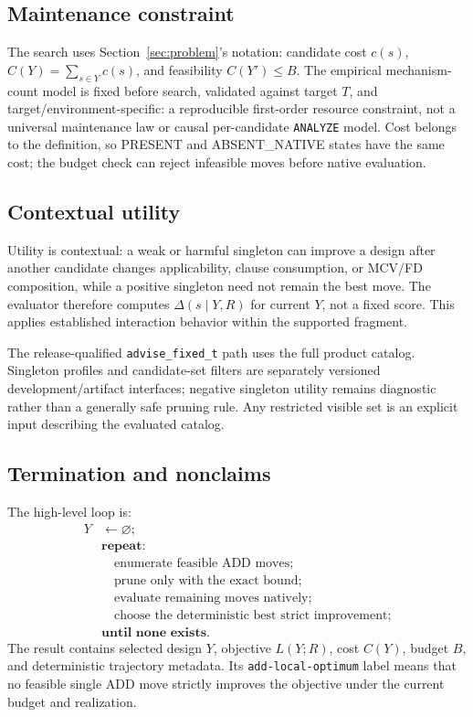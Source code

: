\subsection{Maintenance constraint}

The search uses Section~\ref{sec:problem}'s notation: candidate cost $c(s)$,
$C(Y)=\sum_{s\in Y}c(s)$, and feasibility $C(Y')\le B$.  The empirical
mechanism-count model is fixed before search, validated against target $T$, and
target/environment-specific: a reproducible first-order resource constraint,
not a universal maintenance law or causal per-candidate \texttt{ANALYZE}
model.  Cost belongs to the definition, so PRESENT and ABSENT\_NATIVE states
have the same cost; the budget check can reject infeasible moves before native
evaluation.

\subsection{Contextual utility}

Utility is contextual: a weak or harmful singleton can improve a design after
another candidate changes applicability, clause consumption, or MCV/FD
composition, while a positive singleton need not remain the best move.  The
evaluator therefore computes $\Delta(s\mid Y,R)$ for current $Y$, not a fixed
score.  This applies established interaction behavior within the supported
fragment.

The release-qualified \texttt{advise\_fixed\_t} path uses the full product
catalog.  Singleton profiles and candidate-set filters are separately
versioned development/artifact interfaces; negative singleton utility remains
diagnostic rather than a generally safe pruning rule.  Any restricted visible
set is an explicit input describing the evaluated catalog.

\subsection{Termination and nonclaims}

The high-level loop is:
\[
\begin{aligned}
Y&\leftarrow\varnothing;\\
&\textbf{repeat:}\\
&\quad\text{enumerate feasible ADD moves;}\\
&\quad\text{prune only with the exact bound;}\\
&\quad\text{evaluate remaining moves natively;}\\
&\quad\text{choose the deterministic best strict improvement;}\\
&\textbf{until none exists.}
\end{aligned}
\]
The result contains selected design $Y$, objective $L(Y;R)$, cost $C(Y)$,
budget $B$, and deterministic trajectory metadata.  Its
\texttt{add-local-optimum} label means that no feasible single ADD move
strictly improves the objective under the current budget and realization.

